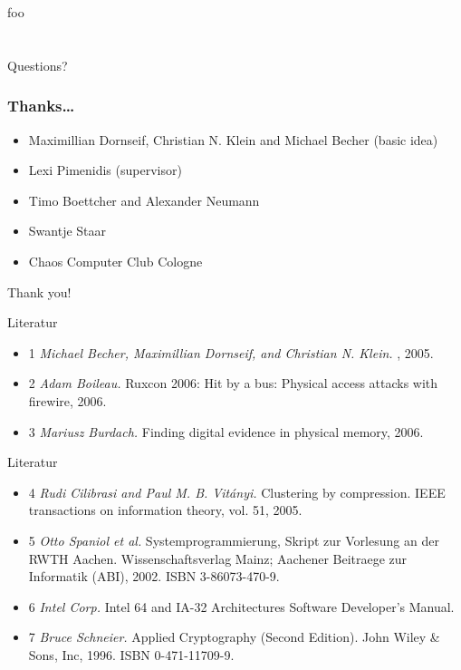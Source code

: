\documentclass{beamer}
\newenvironment{itemizeframe}[1]
  {\begin{frame}{#1}\startitemizeframe}
  {\stopitemizeframe\end{frame}}
\newcommand\startitemizeframe{\begin{itemize}}
\newcommand\stopitemizeframe{\end{itemize}}
\begin{document}
	\begin{frame}
		foo
	\end{frame}

\section*{}

	\begin{frame}
		Questions?
	\end{frame}

	\begin{frame}
		\frametitle{Thanks\ldots}
		\begin{itemize}
			\item Maximillian Dornseif, Christian N. Klein and Michael Becher (basic idea)
			\item Lexi Pimenidis (supervisor)
			\item Timo Boettcher and Alexander Neumann
			\item Swantje Staar
			\item Chaos Computer Club Cologne
		\end{itemize}
		Thank you!
	\end{frame}

	\begin{itemizeframe}{Literatur}
		\item[1] \emph{Michael Becher, Maximillian Dornseif, and Christian N.
			Klein.} , 2005.

		\item[2] \emph{Adam Boileau.} Ruxcon 2006: Hit by a bus: Physical access attacks with
			firewire, 2006.

		\item[3] \emph{Mariusz Burdach.} Finding digital evidence in physical memory, 2006.
	\end{itemizeframe}

	\begin{itemizeframe}{Literatur}
		\item[4] \emph{Rudi Cilibrasi and Paul M. B. Vit\'anyi.} Clustering by compression.
			IEEE transactions on information theory, vol. 51, 2005.

		\item[5] \emph{Otto Spaniol et al.} Systemprogrammierung, Skript zur Vorlesung an der RWTH
			Aachen. Wissenschaftsverlag Mainz; Aachener Beitraege zur Informatik (ABI),
			2002. ISBN 3-86073-470-9.
			
		\item[6] \emph{Intel Corp.} Intel 64 and IA-32 Architectures Software Developer’s Manual.

		\item[7] \emph{Bruce Schneier.} Applied Cryptography (Second Edition). John Wiley \& Sons,
			Inc, 1996. ISBN 0-471-11709-9.
	\end{itemizeframe}
\end{document}
